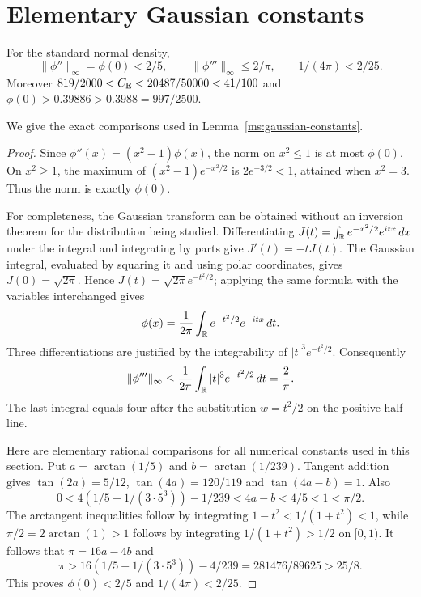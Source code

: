 \section{Elementary Gaussian constants}\label{ms:normalization}\label{ms:gaussian-constant-proof}
\begin{lemma}\label{ms:gaussian-constants}
For the standard normal density,
\[
 \|\phi''\|_\infty=\phi(0)<2/5,\qquad
 \|\phi'''\|_\infty\le2/\pi,\qquad 1/(4\pi)<2/25.
\]
Moreover $819/2000<C_{\mathrm E}<20487/50000<41/100$ and
$\phi(0)>0.39886>0.3988=997/2500$.
\end{lemma}
We give the exact comparisons used in Lemma~\ref{ms:gaussian-constants}.

\begin{proof}
Since $\phi''(x)=(x^2-1)\phi(x)$, the norm on $x^2\le1$ is at most
$\phi(0)$. On $x^2\ge1$, the maximum of
$(x^2-1)e^{-x^2/2}$ is $2e^{-3/2}<1$, attained when $x^2=3$.
Thus the norm is exactly $\phi(0)$.

For completeness, the Gaussian transform can be obtained without an
inversion theorem for the distribution being studied. Differentiating
$J(t)=\int_\mathbb R e^{-x^2/2}e^{itx}\,dx$ under the integral and integrating by
parts give $J'(t)=-tJ(t)$. The Gaussian integral, evaluated by squaring it
and using polar coordinates, gives $J(0)=\sqrt{2\pi}$. Hence
$J(t)=\sqrt{2\pi}e^{-t^2/2}$; applying the same formula with the variables
interchanged gives
\[
 \phi(x)=\frac1{2\pi}\int_\mathbb R e^{-t^2/2}e^{-itx}\,dt.
\]
Three differentiations are justified by the integrability of
$|t|^3e^{-t^2/2}$. Consequently
\[
 \|\phi'''\|_\infty
 \le\frac1{2\pi}\int_\mathbb R|t|^3e^{-t^2/2}\,dt=\frac2\pi.
\]
The last integral equals four after the substitution $w=t^2/2$ on the
positive half-line.

Here are elementary rational comparisons for all numerical constants used
in this section. Put $a=\arctan(1/5)$ and $b=\arctan(1/239)$.
Tangent addition gives $\tan(2a)=5/12$, $\tan(4a)=120/119$ and
$\tan(4a-b)=1$. Also
\[
 0<4(1/5-1/(3\cdot5^3))-1/239<4a-b<4/5<1<\pi/2.
\]
The arctangent inequalities follow by integrating
$1-t^2<1/(1+t^2)<1$, while $\pi/2=2\arctan(1)>1$ follows by integrating
$1/(1+t^2)>1/2$ on $[0,1)$. It follows that $\pi=16a-4b$ and
\[
 \pi>16(1/5-1/(3\cdot5^3))-4/239
      =281476/89625>25/8.
\]
This proves $\phi(0)<2/5$ and $1/(4\pi)<2/25$.


\end{proof}
